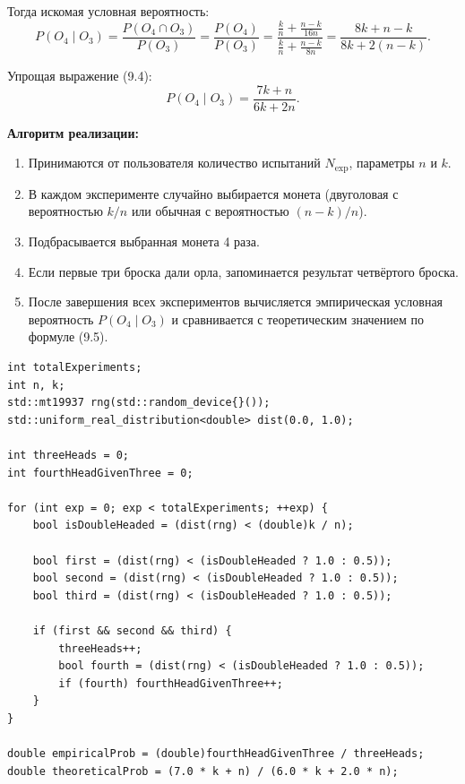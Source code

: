 \documentclass[a4paper]{article}
\theoremstyle{definition}
\begin{document}
Тогда искомая условная вероятность:
\begin{equation}
    P(O_4 \mid O_3) = \frac{P(O_4 \cap O_3)}{P(O_3)} = \frac{P(O_4)}{P(O_3)} = \frac{\frac{k}{n} + \frac{n-k}{16n}}{\frac{k}{n} + \frac{n-k}{8n}} = \frac{8k + n - k}{8k + 2(n-k)}. \tag{9.4}
\end{equation}

Упрощая выражение (9.4):
\begin{equation}
    P(O_4 \mid O_3) = \frac{7k + n}{6k + 2n}. \tag{9.5}
\end{equation}

\textbf{Алгоритм реализации:}

\begin{enumerate}
    \item Принимаются от пользователя количество испытаний $N_{\text{exp}}$, параметры $n$ и $k$.
    \item В каждом эксперименте случайно выбирается монета (двуголовая с вероятностью $k/n$ или обычная с вероятностью $(n-k)/n$).
    \item Подбрасывается выбранная монета 4 раза.
    \item Если первые три броска дали орла, запоминается результат четвёртого броска.
    \item После завершения всех экспериментов вычисляется эмпирическая условная вероятность $P(O_4 \mid O_3)$ и сравнивается с теоретическим значением по формуле (9.5).
\end{enumerate}

\begin{lstlisting}[caption={Основной алгоритм моделирования эксперимента с монетами}, label=lst9]
int totalExperiments;
int n, k;
std::mt19937 rng(std::random_device{}());
std::uniform_real_distribution<double> dist(0.0, 1.0);

int threeHeads = 0;
int fourthHeadGivenThree = 0;

for (int exp = 0; exp < totalExperiments; ++exp) {
    bool isDoubleHeaded = (dist(rng) < (double)k / n);
    
    bool first = (dist(rng) < (isDoubleHeaded ? 1.0 : 0.5));
    bool second = (dist(rng) < (isDoubleHeaded ? 1.0 : 0.5));
    bool third = (dist(rng) < (isDoubleHeaded ? 1.0 : 0.5));
    
    if (first && second && third) {
        threeHeads++;
        bool fourth = (dist(rng) < (isDoubleHeaded ? 1.0 : 0.5));
        if (fourth) fourthHeadGivenThree++;
    }
}

double empiricalProb = (double)fourthHeadGivenThree / threeHeads;
double theoreticalProb = (7.0 * k + n) / (6.0 * k + 2.0 * n);
\end{lstlisting}
\end{document}
